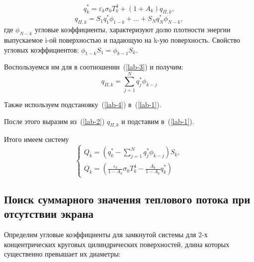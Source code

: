 \documentclass[12pt, a4paper]{article}
\begin{document}
\begin{equation}
	\label{lab-2}
	q_k^{*} = \varepsilon_k \sigma_0 T_k^4 + \left(1 + A_k\right) q_{\Pi, k},
\end{equation}
\begin{equation}
	\label{lab-3}
	q_{\Pi, k} = S_1 q_1^{*} \phi_{1-k} + ... + S_N q_N^{*} \phi_{N-k},
\end{equation}
где $\phi_{N-k}$ угловые коэффициенты, характеризуют долю плотности энергии выпускаемое i-ой поверхностью и падающую на k-ую поверхность. Свойство угловых коэффициентов: $\phi_{1-k} S_1 = \phi_{k-1} S_k$.

Воспользуемся им для в соотношении~(\ref{lab-3}) и получим: 
\begin{equation}
	\label{lab-4}
	q_{\Pi, k} = \sum_{j=1}^{N} q_j^{*} \phi_{k-j}
\end{equation}

Также используем подстановку~(\ref{lab-4}) в~(\ref{lab-1}). 
\[
\]

После этого выразим из~(\ref{lab-2}) $q_{\Pi, k}$ и подставим в~(\ref{lab-1}).
\[
\]

Итого имеем систему
\begin{equation}
	\label{lab-5}
	\begin{cases}
		Q_k = \left(q_k^{*} - \sum_{j = 1}^{N} q_j^{*} \phi_{k-j} \right) S_k, \\
		Q_k = \left(\frac{\varepsilon_k}{1 - A_k}\sigma_0 T^4_k - \frac{A_k}{1 - A_k} q_k^{*} \right)
	\end{cases}
\end{equation}

\subsection{Поиск суммарного значения теплового потока при отсутствии экрана}
Определим угловые коэффициенты для замкнутой системы для 2-х концентрических круговых цилиндрических поверхностей, длина которых существенно превышает их диаметры:
\end{document}
